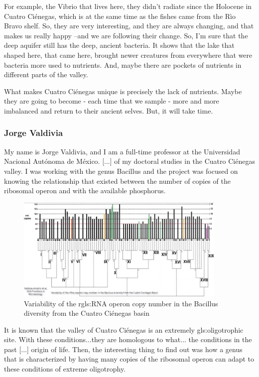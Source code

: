 \documentclass[]{article}
\begin{document}
For example, the Vibrio that lives here, they didn't radiate since the Holocene in Cuatro  Ci\'enegas, which is at the same time as the fishes came from the R\`io Bravo shelf. So, they are very interesting, and they are always changing, and that makes us really happy --and we are following their change. So, I'm sure that the deep aquifer still has the deep, ancient bacteria. It shows that the lake that shaped here, that came here, brought newer creatures from everywhere that were bacteria more used to nutrients. And, maybe there are pockets of nutrients in different parts of the valley.

What makes Cuatro  Ci\'enegas unique is precisely the lack of nutrients. Maybe they are going to become - each time that we sample - more and more imbalanced and return to their ancient selves. But, it will take time.

\subsubsection{Jorge Valdivia}

My name is Jorge Valdivia, and I am a full-time professor at the Universidad Nacional Aut\'onoma de M\'exico. [...] of my doctoral studies in the Cuatro  Ci\'enegas valley. I was working with the genus Bacillus and the project was focused on knowing the relationship that existed between the number of copies of the ribosomal operon and with the available phosphorus.\cite{valdivia2016variability}
\begin{figure}[H]
	\caption[Variability of the r\gls{gls:RNA} operon copy number]{Variability of the r\gls{gls:RNA} operon copy number in the Bacillus diversity from the Cuatro  Ci\'enegas basin} 
	\includegraphics[width=0.9\textwidth]{CuatroCienegas8}
\end{figure}

It is known that the valley of Cuatro  Ci\'enegas is an extremely \gls{gls:oligotroph}ic site. With these conditions...they are homologous to what... the conditions in the past [...] origin of life. Then, the interesting thing to find out was how a genus that is characterized by having many copies of the ribosomal operon can adapt to these conditions of extreme oligotrophy.
\end{document}
